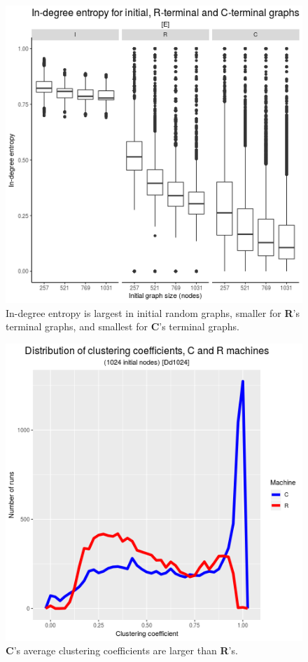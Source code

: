 \documentclass[twoside,twocolumn]{article}
\begin{document}
\begin{figure}
  \includegraphics[width=\linewidth, scale=0.7]{figE.png}
  \caption{In-degree entropy is largest in initial random graphs,
        smaller for \textbf{R}'s terminal graphs, and smallest for \textbf{C}'s terminal graphs.}
  \label{fig:figE}
\end{figure}

\begin{figure}
  \includegraphics[width=\linewidth, scale=0.7]{figDd1024.png}
  \caption{\textbf{C}'s average clustering coefficients are larger than \textbf{R}'s.}
  \label{fig:figDd1024}
\end{figure}
\end{document}

